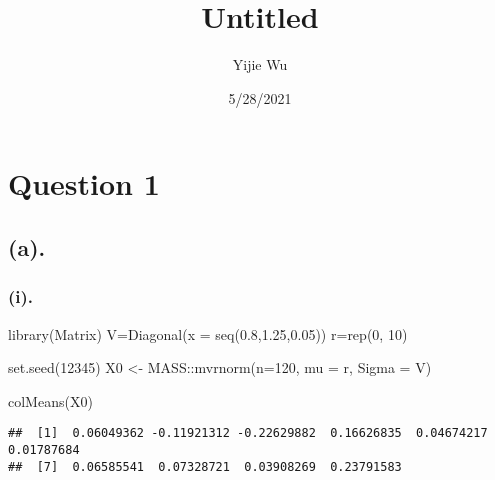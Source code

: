 \documentclass[
]{article}
\title{Untitled}
\author{Yijie Wu}
\date{5/28/2021}
\newenvironment{Shaded}{\begin{snugshade}}{\end{snugshade}}
\newcommand{\AttributeTok}[1]{\textcolor[rgb]{0.77,0.63,0.00}{#1}}
\newcommand{\DecValTok}[1]{\textcolor[rgb]{0.00,0.00,0.81}{#1}}
\newcommand{\FloatTok}[1]{\textcolor[rgb]{0.00,0.00,0.81}{#1}}
\newcommand{\FunctionTok}[1]{\textcolor[rgb]{0.00,0.00,0.00}{#1}}
\newcommand{\NormalTok}[1]{#1}
\newcommand{\OtherTok}[1]{\textcolor[rgb]{0.56,0.35,0.01}{#1}}
\newcommand{\SpecialCharTok}[1]{\textcolor[rgb]{0.00,0.00,0.00}{#1}}
\begin{document}
\maketitle

\hypertarget{question-1}{%
\section{Question 1}\label{question-1}}

\hypertarget{a.}{%
\subsection{(a).}\label{a.}}

\hypertarget{i.}{%
\subsubsection{(i).}\label{i.}}

\begin{Shaded}
\begin{Highlighting}[]
\FunctionTok{library}\NormalTok{(Matrix)}
\NormalTok{V}\OtherTok{=}\FunctionTok{Diagonal}\NormalTok{(}\AttributeTok{x =} \FunctionTok{seq}\NormalTok{(}\FloatTok{0.8}\NormalTok{,}\FloatTok{1.25}\NormalTok{,}\FloatTok{0.05}\NormalTok{))}
\NormalTok{r}\OtherTok{=}\FunctionTok{rep}\NormalTok{(}\DecValTok{0}\NormalTok{, }\DecValTok{10}\NormalTok{)}
\end{Highlighting}
\end{Shaded}

\begin{Shaded}
\begin{Highlighting}[]
\FunctionTok{set.seed}\NormalTok{(}\DecValTok{12345}\NormalTok{)}
\NormalTok{X0 }\OtherTok{\textless{}{-}}\NormalTok{ MASS}\SpecialCharTok{::}\FunctionTok{mvrnorm}\NormalTok{(}\AttributeTok{n=}\DecValTok{120}\NormalTok{, }\AttributeTok{mu =}\NormalTok{ r, }\AttributeTok{Sigma =}\NormalTok{ V)}
\end{Highlighting}
\end{Shaded}

\begin{Shaded}
\begin{Highlighting}[]
\FunctionTok{colMeans}\NormalTok{(X0)}
\end{Highlighting}
\end{Shaded}

\begin{verbatim}
##  [1]  0.06049362 -0.11921312 -0.22629882  0.16626835  0.04674217  0.01787684
##  [7]  0.06585541  0.07328721  0.03908269  0.23791583
\end{verbatim}
\end{document}
